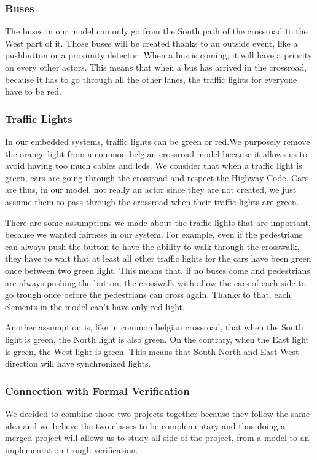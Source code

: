 \subsubsection{Buses}
The buses in our model can only go from the South path of the crossroad to the West part of it. Those buses will be created thanks to an outside event, like a pushbutton or a proximity detector. When a bus is coming, it will have a priority on every other actors. This means that when a bus has arrived in the crossroad, because it has to go through all the other lanes, the traffic lights for everyone have to be red.

\subsubsection{Traffic Lights}
In our embedded systems, traffic lights can be green or red.We purposely remove the orange light from a common belgian crossroad model because it allows us to avoid having too much cables and leds. We consider that when a traffic light is green, cars are going through the crossroad and respect the Highway Code. Cars are thus, in our model, not really an actor since they are not created, we just assume them to pass through the crossroad when their traffic lights are green. 

There are some assumptions we made about the traffic lights that are important, because we wanted fairness in our system. For example, even if the pedestrians can always push the button to have the ability to walk through the crosswalk, they have to wait that at least all other traffic lights for the cars have been green once between two green light. This means that, if no buses come and pedestrians are always pushing the button, the crosswalk with allow the cars of each side to go trough once before the pedestrians can cross again. Thanks to that, each elements in the model can't have only red light.

Another assumption is, like in common belgian crossroad, that when the South light is green, the North light is also green. On the contrary, when the East light is green, the West light is green. This means that South-North and East-West direction will have synchronized lights.

\subsubsection{Connection with Formal Verification}
We decided to combine those two projects together because they follow the same idea and we believe the two classes to be complementary and thus doing a merged project will allows us to study all side of the project, from a model to an implementation trough verification.

